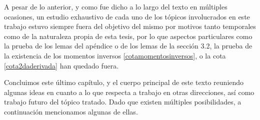\documentclass[letterpaper,twoside,12pt]{book}
\newcommand{\1}{\mathds{1}}
\theoremstyle{definition}
\theoremstyle{definition}
\theoremstyle{remark}
\theoremstyle{definition}
\theoremstyle{definition}
\theoremstyle{definition}
\theoremstyle{definition}
\theoremstyle{definition}
\begin{document}
A pesar de lo anterior, y como fue dicho a lo largo del texto en múltiples ocasiones, un estudio exhaustivo de cada uno de los tópicos involucrados en este trabajo estuvo siempre fuera del objetivo del mismo por motivos tanto temporales como de la naturaleza propia de esta tesis, por lo que aspectos particulares como la prueba de los lemas del apéndice o de los lemas de la sección 3.2, la prueba de la existencia de los momentos inversos \eqref{cotamomentosinversos}, o la cota \eqref{cota2daderivada} han quedado fuera.

Concluimos este último capítulo, y el cuerpo principal de este texto reuniendo algunas ideas en cuanto a lo que respecta a trabajo en otras direcciones, así como trabajo futuro del tópico tratado. Dado que existen múltiples posibilidades, a continuación mencionamos algunas de ellas.
\end{document}
